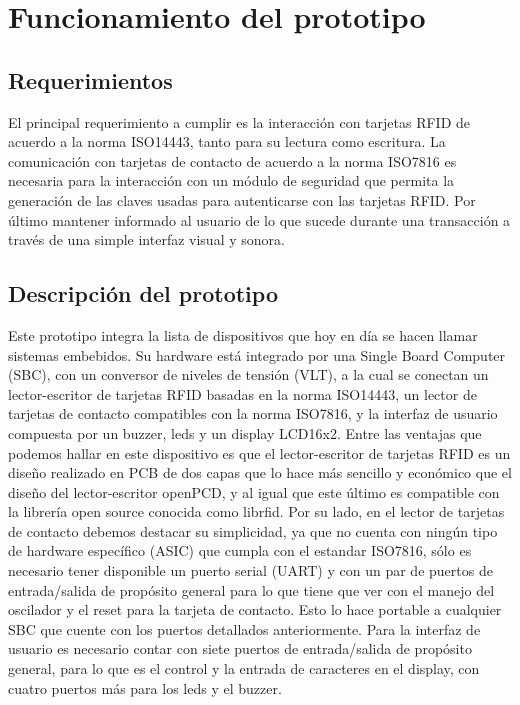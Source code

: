 \chapter{Funcionamiento del prototipo}

\section{Requerimientos}
El principal requerimiento a cumplir es la interacción con tarjetas RFID de acuerdo a la norma ISO14443, tanto para su lectura como escritura.
La comunicación con tarjetas de contacto de acuerdo a la norma ISO7816 es necesaria para la interacción con
un módulo de seguridad que permita la generación de las claves usadas para autenticarse
con las tarjetas RFID.
Por último mantener informado al usuario de lo que sucede durante una transacción
a través de una simple interfaz visual y sonora.


\section{Descripción del prototipo}
Este prototipo integra la lista de dispositivos que hoy en día se hacen llamar sistemas embebidos. Su hardware está integrado por una Single Board Computer (SBC), con un conversor de niveles de tensión (VLT), a la cual se conectan un lector-escritor de tarjetas RFID basadas en la norma ISO14443, un lector de tarjetas de contacto compatibles con la norma ISO7816, y la interfaz de usuario compuesta por un buzzer, leds y un display LCD16x2.
Entre las ventajas que podemos hallar en este dispositivo es que el lector-escritor de tarjetas RFID es un diseño realizado en PCB de dos capas que lo hace más sencillo y económico que el diseño del lector-escritor openPCD, y al igual que este último es compatible con la librería open source conocida como librfid.
Por su lado, en el lector de tarjetas de contacto debemos destacar su simplicidad, ya que no cuenta con ningún tipo de hardware específico (ASIC) que cumpla con el estandar ISO7816, sólo es necesario tener disponible un puerto serial (UART) y con un par de puertos de entrada/salida de propósito general para lo que tiene que ver con el manejo del oscilador y el reset para la tarjeta de contacto. Esto lo hace portable a cualquier SBC que cuente con los puertos detallados anteriormente.
Para la interfaz de usuario es necesario contar con siete puertos de entrada/salida de propósito general, para lo que es el control y la entrada de caracteres en el display, con cuatro puertos más para los leds y el buzzer.


